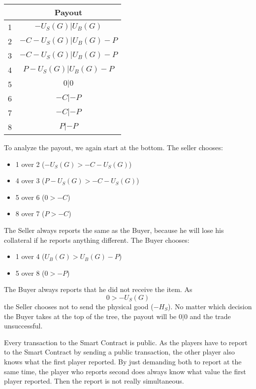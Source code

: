 \documentclass{cacthesis}
\begin{document}
\begin{center}
\begin{tabular}{ |c|c| }
\hline
& Payout  \\
\hline
\hline
1& $-U_S(G)| U_B(G)$\\
\hline
2& $-C-U_S(G)| U_B(G)-P$\\
\hline
3&$-C-U_S(G)|U_B(G) -P$ \\
\hline
4& $P-U_S(G)| U_B(G) - P$\\
\hline
5& $0|0$\\
\hline 
6& $-C | -P$\\
\hline
7& $-C|-P$\\
\hline
8& $P| -P$\\
\hline
\end{tabular}
\end{center}
To analyze the payout, we again start at the bottom. The seller chooses:
\begin{itemize}
    \item 1 over 2 ($-U_S(G)>-C - U_S(G)$)
    \item 4 over 3 ($P-U_S(G)> -C-U_S(G)$)
    \item 5 over 6 ($0 > -C$)
    \item 8 over 7 ($P > -C$)
\end{itemize}
The Seller always reports the same as the Buyer, because he will lose his collateral if he reports anything different.\newline
The Buyer chooses:
\begin{itemize}
    \item 1 over 4 ($U_B(G)>U_B(G) - P$)
    \item 5 over 8 ($0>-P$)
\end{itemize}
The Buyer always reports that he did not receive the item.\newline
As \[0 > -U_S(G)\] the Seller chooses not to send the physical good ($-H_S$).\newline
No matter which decision the Buyer takes at the top of the tree, the payout will be $0|0$ and the trade unsuccessful.


 Every transaction to the Smart Contract is public. As the players have to report to the Smart Contract by sending a public transaction, the other player also knows what the first player reported. By just demanding both to report at the same time, the player who reports second does always know what value the first player reported. Then the report is not really simultaneous.\newline
 
\end{document}
